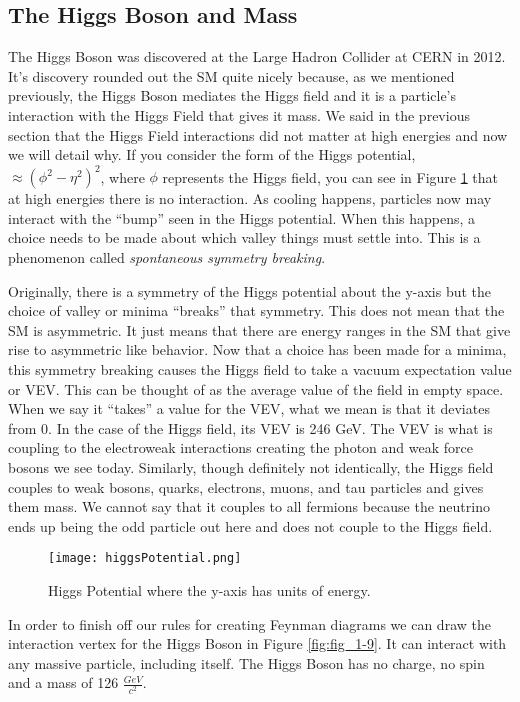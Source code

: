 \subsection{The Higgs Boson and Mass}

The Higgs Boson was discovered at the Large Hadron Collider at CERN in 2012. It's discovery rounded out the SM quite nicely because, as we mentioned previously, the Higgs Boson mediates the Higgs field and it is a particle's interaction with the Higgs Field that gives it mass.
We said in the previous section that the Higgs Field interactions did not matter at high energies and now we will detail why. If you consider the form of the Higgs potential, $\approx (\phi^2 - \eta^2)^2$, where $\phi$ represents the Higgs field, you can see in Figure \ref{fig:fig_1-8} that at high energies there is no interaction.
As cooling happens, particles now may interact with the ``bump'' seen in the Higgs potential. When this happens, a choice needs to be made about which valley things must settle into. This is a phenomenon called \textit{spontaneous symmetry breaking}.

Originally, there is a symmetry of the Higgs potential about the y-axis but the choice of valley or minima ``breaks'' that symmetry. This does not mean that the SM is asymmetric. It just means that there are energy ranges in the SM that give rise to asymmetric like behavior.
Now that a choice has been made for a minima, this symmetry breaking causes the Higgs field to take a vacuum expectation value or VEV. This can be thought of as the average value of the field in empty space.
When we say it ``takes'' a value for the VEV, what we mean is that it deviates from $0$. In the case of the Higgs field, its VEV is 246 GeV. The VEV is what is coupling to the electroweak interactions creating the photon and weak force bosons we see today.
Similarly, though definitely not identically, the Higgs field couples to weak bosons, quarks, electrons, muons, and tau particles and gives them mass. We cannot say that it couples to all fermions because the neutrino ends up being the odd particle out here and does not couple to the Higgs field.
\begin{figure} %
   \centering
   \texttt{[image: higgsPotential.png]}
   \caption{Higgs Potential where the y-axis has units of energy.}
   \label{fig:fig_1-8}
\end{figure}
In order to finish off our rules for creating Feynman diagrams we can draw the interaction vertex for the Higgs Boson in Figure \ref{fig:fig_1-9}. 
It can interact with any massive particle, including itself. 
The Higgs Boson has no charge, no spin and a mass of 126 $\frac{GeV}{c^2}$.

